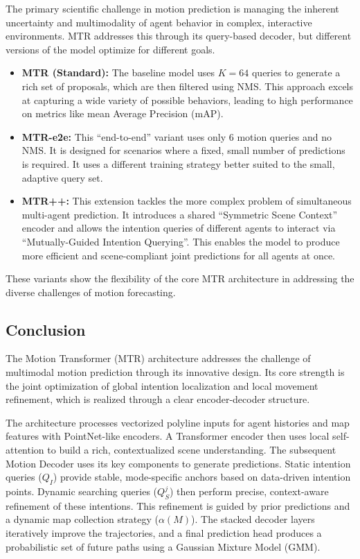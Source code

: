 The primary scientific challenge in motion prediction is managing the inherent uncertainty and multimodality of agent behavior in complex, interactive environments. MTR addresses this through its query-based decoder, but different versions of the model optimize for different goals.

\begin{itemize}
    \item \textbf{MTR (Standard):} The baseline model uses $K=64$ queries to generate a rich set of proposals, which are then filtered using NMS. This approach excels at capturing a wide variety of possible behaviors, leading to high performance on metrics like mean Average Precision (mAP).
    \item \textbf{MTR-e2e:} This ``end-to-end'' variant uses only 6 motion queries and no NMS. It is designed for scenarios where a fixed, small number of predictions is required. It uses a different training strategy better suited to the small, adaptive query set.
    \item \textbf{MTR++:} This extension tackles the more complex problem of simultaneous multi-agent prediction. It introduces a shared ``Symmetric Scene Context'' encoder and allows the intention queries of different agents to interact via ``Mutually-Guided Intention Querying''. This enables the model to produce more efficient and scene-compliant joint predictions for all agents at once.
\end{itemize}

These variants show the flexibility of the core MTR architecture in addressing the diverse challenges of motion forecasting.

\subsection{Conclusion}
\label{sec:conclusion}

The Motion Transformer (MTR) architecture addresses the challenge of multimodal motion prediction through its innovative design. Its core strength is the joint optimization of global intention localization and local movement refinement, which is realized through a clear encoder-decoder structure.

The architecture processes vectorized polyline inputs for agent histories and map features with PointNet-like encoders. A Transformer encoder then uses local self-attention to build a rich, contextualized scene understanding. The subsequent Motion Decoder uses its key components to generate predictions. Static intention queries ($Q_I$) provide stable, mode-specific anchors based on data-driven intention points. Dynamic searching queries ($Q_S^j$) then perform precise, context-aware refinement of these intentions. This refinement is guided by prior predictions and a dynamic map collection strategy ($\alpha(M)$). The stacked decoder layers iteratively improve the trajectories, and a final prediction head produces a probabilistic set of future paths using a Gaussian Mixture Model (GMM).

